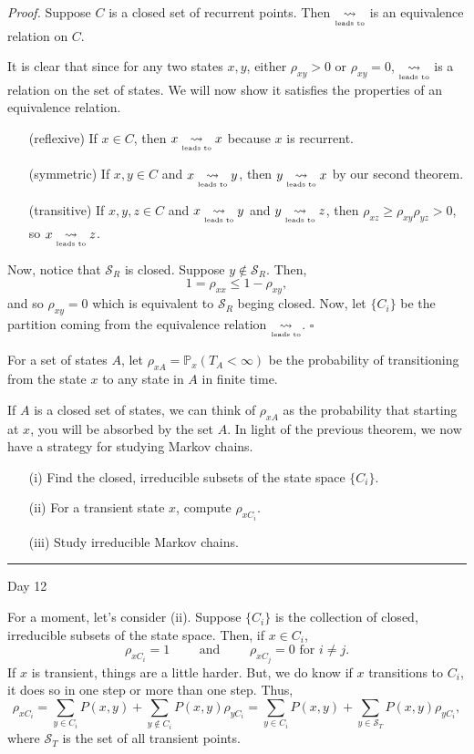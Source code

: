 \documentclass{problemset}
\renewcommand{\P}{\mathbb{P}}
\newcommand{\ldsto}{\underset{\text{\tiny leads to}}{\leadsto}}
\newcommand{\fatrule}[1]{\vspace{.3cm}\hrule {\hfill \sf #1}\par}
\newenvironment{proof}{\emph{Proof.}}{\hfill$\square$}
\begin{document}
	\begin{proof}
		Suppose $C$ is a closed set of recurrent points. Then $\ldsto$ is an equivalence
		relation on $C$.

		It is clear that since for any two states $x,y$, either $\rho_{xy}>0$ or $\rho_{xy}=0$,
		$\ldsto$ is a relation on the set of states.  We will now show it satisfies the properties
		of an equivalence relation.

		\begin{enumerate}
			\item[(reflexive)] If $x\in C$, then $x\ldsto x$ because $x$ is recurrent.
			\item[(symmetric)] If $x,y\in C$ and $x\ldsto y$, then $y\ldsto x$ by our second theorem.
			\item[(transitive)] If $x,y,z\in C$ and $x\ldsto y$ and $y\ldsto z$, then
				$\rho_{xz} \geq \rho_{xy}\rho_{yz} > 0$, so $x\ldsto z$.
		\end{enumerate}

		Now, notice that $\mathcal S_R$ is closed.  Suppose $y\notin \mathcal S_R$.  Then,
		\[
			1=\rho_{xx} \leq 1-\rho_{xy},
		\]
		and so $\rho_{xy}=0$ which is equivalent to $\mathcal S_R$ beging closed.  Now,
		let $\{C_i\}$ be the partition coming from the equivalence relation $\ldsto$.
	\end{proof}

	\begin{definition}
		For a set of states $A$, let $\rho_{xA}=\P_x(T_A<\infty)$ be the probability of transitioning
		from the state $x$ to any state in $A$ in finite time.
	\end{definition}

	If $A$ is a closed set of states, we can think of $\rho_{xA}$ as the probability that starting
	at $x$, you will be absorbed by the set $A$.  In light of the previous
	theorem, we now have a strategy for studying Markov chains.
	\begin{enumerate}
		\item[(i)] Find the closed, irreducible subsets of the state space $\{C_i\}$.
		\item[(ii)] For a transient state $x$, compute $\rho_{xC_i}$.
		\item[(iii)] Study irreducible Markov chains.
	\end{enumerate}

	\fatrule{Day 12}
	For a moment, let's consider (ii).  Suppose $\{C_i\}$ is the collection of closed, irreducible subsets
	of the state space.  Then, if $x\in C_i$,
	\[
		\rho_{xC_i} = 1\qquad\text{ and }\qquad \rho_{xC_j} = 0\text{ for $i\neq j$}.
	\]
	If $x$ is transient, things are a little harder.  But, we do know if $x$ transitions 
	to $C_i$, it does so in one step or more than one step.  Thus,
	\begin{equation}
		\label{EqRhoC}
		\rho_{xC_i} = \sum_{y\in C_i} P(x,y) + \sum_{y\notin C_i} P(x,y)\rho_{yC_i}
		= \sum_{y\in C_i} P(x,y) + \sum_{y\in \mathcal S_T} P(x,y)\rho_{yC_i},
	\end{equation}
	where $\mathcal S_T$ is the set of all transient points.
\end{document}
